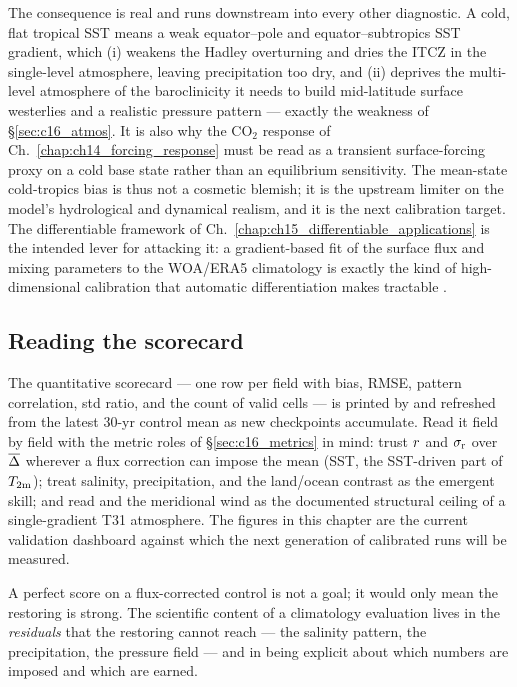 The consequence is real and runs downstream into every other diagnostic. A cold,
flat tropical SST means a weak equator--pole and equator--subtropics SST
gradient, which (i) weakens the Hadley overturning and dries the ITCZ in the
single-level atmosphere, leaving precipitation too dry, and (ii) deprives the
multi-level \dino{} atmosphere of the baroclinicity it needs to build
mid-latitude surface westerlies and a realistic pressure pattern --- exactly the
 weakness of \S\ref{sec:c16_atmos}. It is also why the
CO$_2$ response of Ch.~\ref{chap:ch14_forcing_response} must be read as a
transient surface-forcing proxy on a cold base state rather than an equilibrium
sensitivity. The mean-state cold-tropics bias is thus not a cosmetic blemish; it
is the upstream limiter on the model's hydrological and dynamical realism, and it
is the next calibration target. The differentiable framework of
Ch.~\ref{chap:ch15_differentiable_applications} is the intended lever for
attacking it: a gradient-based fit of the surface flux and mixing parameters to
the WOA/ERA5 climatology is exactly the kind of high-dimensional calibration
that automatic differentiation makes tractable \citep{jax2018}.

\subsection{Reading the scorecard}

The quantitative scorecard --- one row per field with bias, RMSE, pattern
correlation, std ratio, and the count of valid cells --- is printed by
 and refreshed from the latest 30-yr control
mean as new checkpoints accumulate. Read it field by field with the metric
roles of \S\ref{sec:c16_metrics} in mind: trust $r$ and $\sigma_{\mathrm{r}}$ over
$\overline{\Delta}$ wherever a flux correction can impose the mean (SST, the SST-driven
part of $T_{2\mathrm{m}}$); treat salinity, precipitation, and the land/ocean contrast as
the emergent skill; and read  and the meridional wind as the
documented structural ceiling of a single-gradient T31 atmosphere. The figures
in this chapter are the current validation dashboard against which the next
generation of calibrated runs will be measured.

\begin{remark}
A perfect score on a flux-corrected control is not a goal; it would only mean the
restoring is strong. The scientific content of a climatology evaluation lives in
the \emph{residuals} that the restoring cannot reach --- the salinity pattern,
the precipitation, the pressure field --- and in being explicit about which
numbers are imposed and which are earned.
\end{remark}

